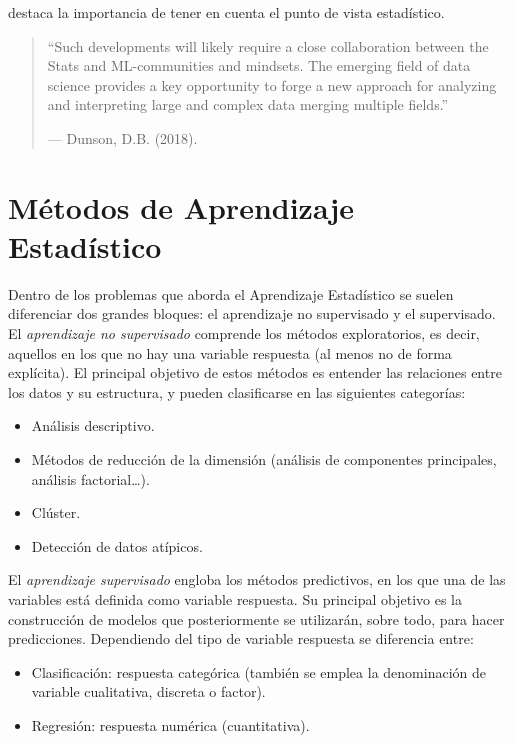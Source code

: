 \documentclass[
]{book}
\theoremstyle{break}
\theoremstyle{nonumberplain}
\begin{document}
destaca la importancia de tener en cuenta el punto de vista estadístico.

\begin{quote}
``Such developments will likely require a close collaboration between the Stats and ML-communities and mindsets. The emerging field of data science provides a key opportunity to forge a new approach for analyzing and interpreting large and complex data merging multiple fields.''

--- Dunson, D.B.
(2018).
\end{quote}

\hypertarget{muxe9todos-de-aprendizaje-estaduxedstico}{%
\section{Métodos de Aprendizaje Estadístico}\label{muxe9todos-de-aprendizaje-estaduxedstico}}

Dentro de los problemas que aborda el Aprendizaje Estadístico se suelen diferenciar dos grandes bloques: el aprendizaje no supervisado y el supervisado.
El \emph{aprendizaje no supervisado} comprende los métodos exploratorios, es decir, aquellos en los que no hay una variable respuesta (al menos no de forma explícita).
El principal objetivo de estos métodos es entender las relaciones entre los datos y su estructura, y pueden clasificarse en las siguientes categorías:

\begin{itemize}
\item
  Análisis descriptivo.
\item
  Métodos de reducción de la dimensión (análisis de componentes principales, análisis factorial\ldots).
\item
  Clúster.
\item
  Detección de datos atípicos.
\end{itemize}

El \emph{aprendizaje supervisado} engloba los métodos predictivos, en los que una de las variables está definida como variable respuesta.
Su principal objetivo es la construcción de modelos que posteriormente se utilizarán, sobre todo, para hacer predicciones.
Dependiendo del tipo de variable respuesta se diferencia entre:

\begin{itemize}
\item
  Clasificación: respuesta categórica (también se emplea la denominación de variable cualitativa, discreta o factor).
\item
  Regresión: respuesta numérica (cuantitativa).
\end{itemize}
\end{document}
